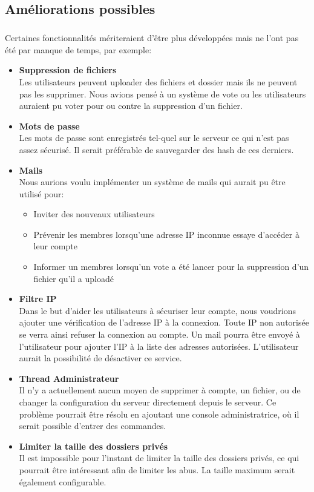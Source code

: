 \documentclass[12pt,a4paper,twoside]{article}
\begin{document}
		\subsection{Améliorations possibles} %
			\subparagraph*{}
				Certaines fonctionnalités mériteraient d'être plus développées mais ne l'ont pas été par manque de temps, par exemple:
				\begin{itemize}
					\item{} \textbf{Suppression de fichiers}\\
						Les utilisateurs peuvent uploader des fichiers et dossier mais ils ne peuvent pas les supprimer. Nous avions pensé à un système de vote ou les utilisateurs auraient pu voter pour ou contre la suppression d'un fichier.
					\item{} \textbf{Mots de passe}\\
						Les mots de passe sont enregistrés tel-quel sur le serveur ce qui n'est pas assez sécurisé. Il serait préférable de sauvegarder des hash de ces derniers.
					\item{} \textbf{Mails}\\
						Nous aurions voulu implémenter un système de mails qui aurait pu être utilisé pour:
						\begin{itemize}
							\item{} Inviter des nouveaux utilisateurs
							\item{} Prévenir les membres lorsqu'une adresse IP inconnue essaye d'accéder à leur compte
							\item{} Informer un membres lorsqu'un vote a été lancer pour la suppression d'un fichier qu'il a uploadé
						\end{itemize}
					\item{} \textbf{Filtre IP}\\
						Dans le but d'aider les utilisateurs à sécuriser leur compte, nous voudrions ajouter une vérification de l'adresse IP à la connexion. Toute IP non autorisée se verra ainsi refuser la connexion au compte. Un mail pourra être envoyé à l'utilisateur pour ajouter l'IP à la liste des adresses autorisées. L'utilisateur aurait la possibilité de désactiver ce service.
					\item{} \textbf{Thread Administrateur}\\
						Il n'y a actuellement aucun moyen de supprimer à compte, un fichier, ou de changer la configuration du serveur directement depuis le serveur. Ce problème pourrait être résolu en ajoutant une console administratrice, où il serait possible d'entrer des commandes.
					\item{} \textbf{Limiter la taille des dossiers privés}\\
						Il est impossible pour l'instant de limiter la taille des dossiers privés, ce qui pourrait être intéressant afin de limiter les abus. La taille maximum serait également configurable.
				\end{itemize}
\end{document}
